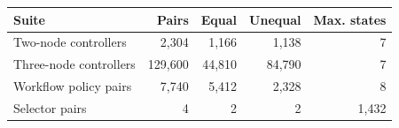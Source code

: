 \begin{tabular}{lrrrr}
\toprule
Suite & Pairs & Equal & Unequal & Max. states \\
\midrule
Two-node controllers & 2,304 & 1,166 & 1,138 & 7 \\
Three-node controllers & 129,600 & 44,810 & 84,790 & 7 \\
Workflow policy pairs & 7,740 & 5,412 & 2,328 & 8 \\
Selector pairs & 4 & 2 & 2 & 1,432 \\
\bottomrule
\end{tabular}
